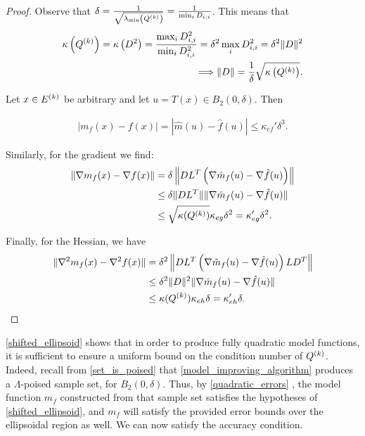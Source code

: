 \begin{proof}


Observe that $\delta = \frac 1 {\sqrt{\lambda_{\text{min}}\left({Q^{(k)}}\right)}} = \frac 1 {\min_{i} D_{i, i}}$.
This means that 
\begin{align*}
{\kappa}\left({Q^{(k)}}\right) = \kappa\left(D^2\right) = \frac{\max_{i}D_{i,i}^2}{\min_{i}D_{i,i}^2} = \delta^2 \max_{i}D_{i,i}^2 = \delta^2 \|D\|^2 \\
\Longrightarrow \|D\| = \frac 1 {\delta} \sqrt{{\kappa}\left({Q^{(k)}}\right)}.
\end{align*}

Let $x \in {E^{(k)}}$ be arbitrary and let $u = T(x) \in B_2(0,\delta)$.  Then


\begin{align*}
 | m_f(x) - f(x)| = |\hat m(u) - \hat f(u)| \le \kappa_{ef}'\delta^3.
\end{align*}

Similarly, for the gradient we find:
\begin{align*}
\| \nabla m_f(x) - \nabla f(x)\| &= \delta\left\|DL^T\left(\nabla\hat m_f(u) - \nabla \hat f(u)\right)\right\| \\
& \le \delta \|DL^T\|\|\nabla \hat m_f(u) - \nabla \hat f(u)\| \\
& \le \sqrt{{\kappa}({Q^{(k)}})}\kappa_{eg} \delta^2 = \kappa_{eg}' \delta^2. 
\end{align*}

Finally,  for the Hessian, we have
\begin{align*}
\| \nabla^2 m_f(x) - \nabla^2 f(x)\| & = \delta^2\left\|DL^T\left(\nabla\hat m_f(u) - \nabla \hat f(u)\right)LD^T\right\| \\
& \le \delta^2 \|D\|^2\|\nabla \hat m_f(u) - \nabla \hat f(u)\| \\
& \le {\kappa}({Q^{(k)}})\kappa_{eh} \delta = \kappa_{eh}' \delta.
\end{align*}

\end{proof}

\cref{shifted_ellipsoid} shows that in order to produce fully quadratic model functions,
it is sufficient to ensure a uniform bound on the condition number of ${Q^{(k)}}$.
Indeed, recall from \cref{set_is_poised} that \cref{model_improving_algorithm} produces a $\Lambda$-poised sample set, for $B_2(0,\delta)$.
Thus, by \cref{quadratic_errors}
, the model function $\hat{m}_f$ constructed from that sample set 
satisfies the hypotheses of \cref{shifted_ellipsoid},
and $m_f$ will satisfy the provided error bounds over the ellipsoidal region as well.
We can now satisfy the accuracy condition.

